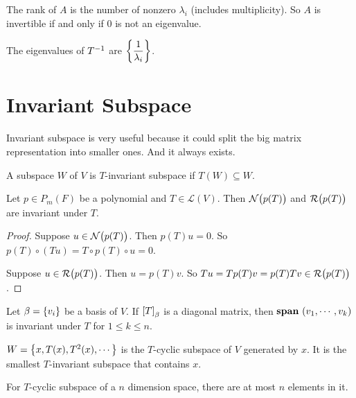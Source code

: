 \begin{theorem}
    The rank of $A$ is the number of nonzero $\lambda_i$ (includes multiplicity). So $A$ is invertible if and only if $0$ is not an eigenvalue.    
\end{theorem}


\begin{theorem}
    The eigenvalues of ${T}^{-1}$ are $\displaystyle \set{\frac{1}{\lambda_i}}$.
\end{theorem}



\section{Invariant Subspace}

Invariant subspace is very useful because it could split the big matrix representation into smaller ones. And it always exists.

\begin{definition}
    A subspace $W$ of $V$ is $T$-invariant subspace if $T(W) \subseteq W$.
\end{definition}

\begin{example}
    Let $p \in P_m(F)$ be a polynomial and $T \in \mathcal{L}(V)$. Then $\nullspace{p(T)}$ and $\rangespace{p(T)}$ are invariant under $T$.
\end{example}
\begin{proof}
    Suppose $u \in \nullspace{p(T)}$. Then $p(T)u = 0$. So $p(T) \circ (Tu) = T \circ p(T) \circ u = 0$.
    
    Suppose $u \in \rangespace{p(T)}$. Then $u = p(T)v$. So $Tu = Tp(T)v = p(T) Tv \in \rangespace{p(T)}$.
\end{proof}

\begin{example}
    Let $\beta = \set{v_i}$ be a basis of $V$. If $\coordinate{T}_\beta$ is a diagonal matrix, then $\spanset{v_1, \cdots, v_k}$ is invariant under $T$ for $1 \leq k \leq n$.
\end{example}



\begin{definition}
    $W = \set{ x, T(x), T^2(x), \cdots}$ is the $T$-cyclic subspace of $V$ generated by $x$. It is the smallest $T$-invariant subspace that contains $x$.
    
    For $T$-cyclic subspace of a $n$ dimension space, there are at most $n$ elements in it. 
\end{definition}


